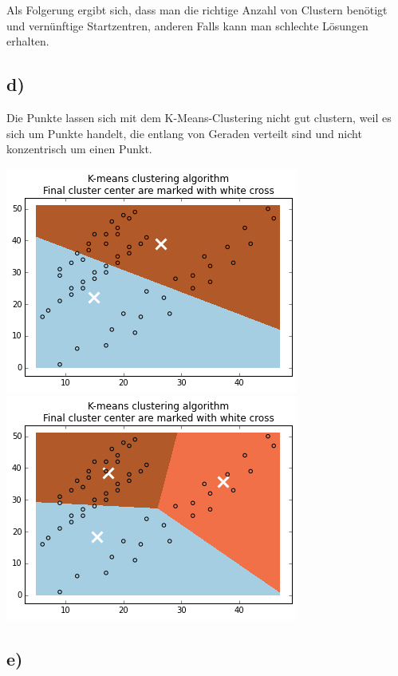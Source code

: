 \documentclass[a4paper,parskip=full-]{article}
\begin{document}
Als Folgerung ergibt sich, dass man die richtige Anzahl von Clustern benötigt und vernünftige Startzentren, anderen Falls kann man schlechte Lösungen erhalten.

\subsection{d)}
Die Punkte lassen sich mit dem K-Means-Clustering nicht gut clustern, weil es sich um Punkte handelt, die entlang von Geraden verteilt sind und nicht konzentrisch um einen Punkt.\\

\begin{minipage}{\textwidth}
\centering
	\includegraphics[scale=0.5]{spaeth_05_2clu.png}
	\hfill
	\includegraphics[scale=0.5]{spaeth_05_3clu.png}
\end{minipage}


\subsection{e)}
\end{document}
